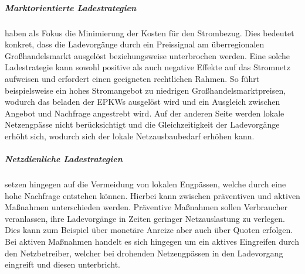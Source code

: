 \subparagraph{Marktorientierte Ladestrategien} haben als Fokus die Minimierung der Kosten für den Strombezug. Dies bedeutet konkret, dass die Ladevorgänge durch ein Preissignal am überregionalen Großhandelsmarkt ausgelöst beziehungsweise unterbrochen werden.
Eine solche Ladestrategie kann sowohl positive als auch negative Effekte auf das Stromnetz aufweisen und erfordert einen geeigneten rechtlichen Rahmen.
So führt beispielsweise ein hohes Stromangebot zu niedrigen Großhandelsmarktpreisen, wodurch das beladen der \glspl{EPKW} ausgelöst wird und ein Ausgleich zwischen Angebot und Nachfrage angestrebt wird.
Auf der anderen Seite werden lokale Netzengpässe nicht berücksichtigt und die Gleichzeitigkeit der Ladevorgänge erhöht sich, wodurch sich der lokale Netzausbaubedarf erhöhen kann. \cite{Agora2019} \cite{Dorendorf2019} \cite{Rehtanz2017}


\subparagraph{Netzdienliche Ladestrategien} setzen hingegen auf die Vermeidung von lokalen Engpässen, welche durch eine hohe Nachfrage entstehen können.
Hierbei kann zwischen präventiven und aktiven Maßnahmen unterschieden werden.
Präventive Maßnahmen sollen Verbraucher veranlassen, ihre Ladevorgänge in Zeiten geringer Netzauslastung zu verlegen.
Dies kann zum Beispiel über monetäre Anreize aber auch über Quoten erfolgen.
Bei aktiven Maßnahmen handelt es sich hingegen um ein aktives Eingreifen durch den Netzbetreiber, welcher bei drohenden Netzengpässen in den Ladevorgang eingreift und diesen unterbricht. \cite{Agora2019}

